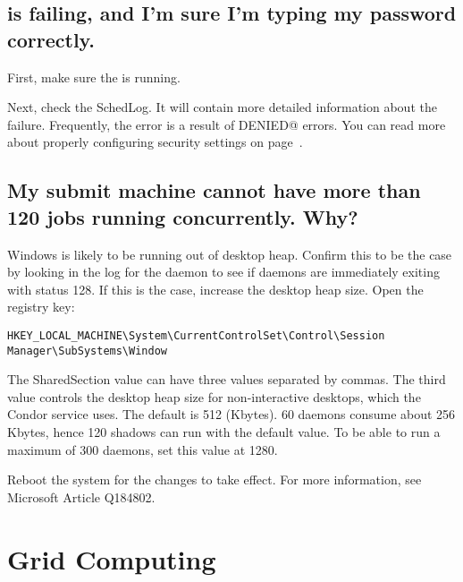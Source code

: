\subsection*{ is failing, and I'm sure I'm typing my password correctly.}

First, make sure the  is running.

Next, check the SchedLog. It will contain more detailed information
about the failure. Frequently, the error is a result of 
\verb@PERMISSION DENIED@ errors. You can read more about properly configuring 
security settings on page~\pageref{sec:Host-Security}.


\subsection*{My submit machine cannot have more than 120 jobs running concurrently. Why?}

Windows is likely to be running out of desktop heap. 
Confirm this to be the case
by looking in the log for the  daemon
to see if  daemons are immediately
exiting with status 128.
If this is the case, increase the desktop heap size.
Open the registry key:

\footnotesize
\begin{verbatim}
HKEY_LOCAL_MACHINE\System\CurrentControlSet\Control\Session Manager\SubSystems\Window
\end{verbatim}
\normalsize

The SharedSection value can have three values separated by commas.
The third value controls the desktop heap size for non-interactive desktops,
which the Condor service uses.
The default is 512 (Kbytes).
60  daemons consume about 256 Kbytes,
hence 120 shadows can run with the default value.
To be able to run a maximum of 300  daemons,
set this value at 1280.

Reboot the system for the changes to take effect.
For more information,
see Microsoft Article Q184802.

\section{Grid Computing}

